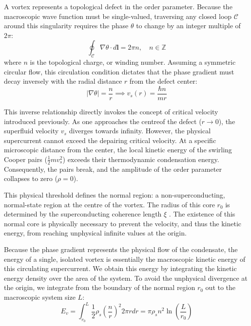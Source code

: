 \documentclass[english,binding=0.6cm,noexaminfo]{sapthesis}
\newcommand{\rhos}{\rho_s}
\begin{document}
A vortex represents a topological defect in the order parameter. Because the macroscopic wave function must be single-valued, traversing any closed loop $\mathcal{C}$ around this singularity requires the phase $\theta$ to change by an integer multiple of $2\pi$:
\begin{equation}
    \oint_{\mathcal{C}} \nabla \theta \cdot d\mathbf{l} = 2\pi n, \quad n \in \mathbb{Z}
\end{equation}
where $n$ is the topological charge, or winding number. Assuming a symmetric circular flow, this circulation condition dictates that the phase gradient must decay inversely with the radial distance $r$ from the defect center:
\begin{equation}
    |\nabla \theta| = \frac{n}{r} \implies v_s(r) = \frac{\hbar n}{m r}
\end{equation}

This inverse relationship directly invokes the concept of critical velocity introduced previously. As one approaches the centreof the defect ($r \to 0$), the superfluid velocity $v_s$ diverges towards infinity. However, the physical supercurrent cannot exceed the depairing critical velocity. At a specific microscopic distance from the center, the local kinetic energy of the swirling Cooper pairs ($\frac{1}{2}mv_s^2$) exceeds their thermodynamic condensation energy. Consequently, the pairs break, and the amplitude of the order parameter collapses to zero ($\rho = 0$). 

This physical threshold defines the normal region: a non-superconducting, normal-state region at the centre of the vortex. The radius of this core $r_0$ is determined by the superconducting coherence length $\xi$ \cite{tinkham1996introduction}. The existence of this normal core is physically necessary to prevent the velocity, and thus the kinetic energy, from reaching unphysical infinite values at the origin.

Because the phase gradient represents the physical flow of the condensate, the energy of a single, isolated vortex is essentially the macroscopic kinetic energy of this circulating supercurrent. We obtain this energy by integrating the kinetic energy density over the area of the system. To avoid the unphysical divergence at the origin, we integrate from the boundary of the normal region $r_0$ out to the macroscopic system size $L$:
\begin{equation}
    E_{v} = \int_{r_0}^{L} \frac{1}{2} \rhos \left( \frac{n}{r} \right)^2 2\pi r dr = \pi \rhos n^2 \ln\left(\frac{L}{r_0}\right)
\end{equation}
\end{document}
